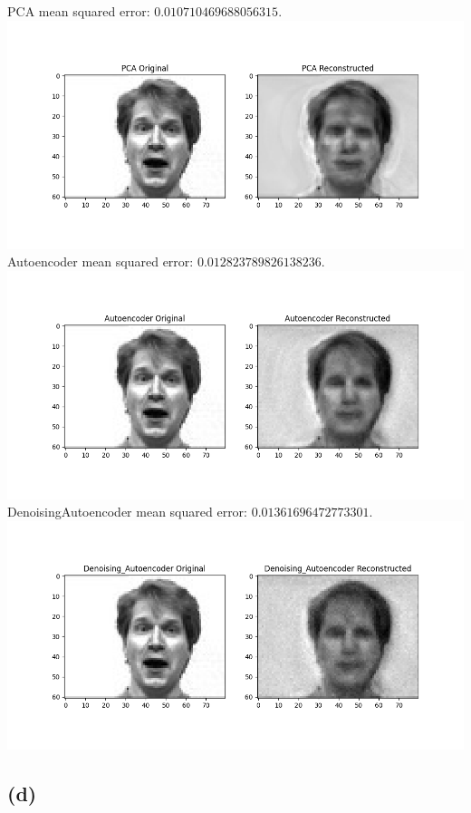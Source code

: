 PCA mean squared error: $0.010710469688056315$.\\
\includegraphics[width=15cm]{PCA_Compare.png}\\
Autoencoder mean squared error: $0.012823789826138236$.\\
\includegraphics[width=15cm]{Autoencoder_Compare.png}\\
DenoisingAutoencoder mean squared error: $0.01361696472773301$.\\
\includegraphics[width=15cm]{Denoising_Autoencoder_Compare.png}

\subsection{(d)}

